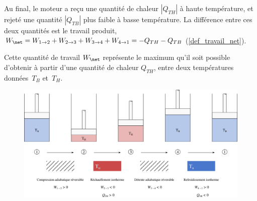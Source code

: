 		Au final, le moteur a reçu une quantité de chaleur $|Q_{TH}|$ à haute température, et rejeté une quantité $|Q_{TB}|$ plus faible à basse température. La différence entre ces deux quantités est le travail produit, $W_\net = W_{1 \to 2} + W_{2 \to 3} + W_{3 \to 4} + W_{4 \to 1} = - Q_{TH} - Q_{TB}$ (\ref{def_travail_net}).
		
		Cette quantité de travail $W_\net$ représente le maximum qu’il soit possible d’obtenir à partir d’une quantité de chaleur $Q_{TH}$, entre deux températures données~$T_B$ et~$T_H$. 

		\begin{landscape}

		\begin{figure}
			\begin{center}
				\includegraphics[width=\linewidth]{images/moteur_carnot_sf.png}
			\end{center}
			\label{fig_carnot_quatre_etapes}
		\end{figure}


\end{landscape}
